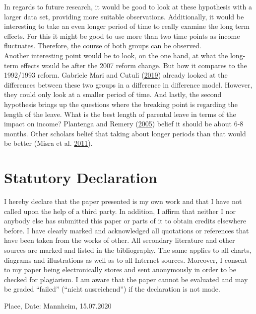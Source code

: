 \documentclass[
  12pt,
]{article}
\begin{document}
In regards to future research, it would be good to look at these hypothesis with a larger data set, providing more suitable observations. Additionally, it would be interesting to take an even longer period of time to really examine the long term effects. For this it might be good to use more than two time points as income fluctuates. Therefore, the course of both groups can be observed.\\
Another interesting point would be to look, on the one hand, at what the long-term effects would be after the 2007 reform change. But how it compares to the 1992/1993 reform.
Gabriele Mari and Cutuli (\protect\hyperlink{ref-gabriele_mari_parental_2019}{2019}) already looked at the differences between these two groups in a difference in difference model. However, they could only look at a smaller period of time.
And lastly, the second hypothesis brings up the questions where the breaking point is regarding the length of the leave. What is the best length of parental leave in terms of the impact on income? Plantenga and Remery (\protect\hyperlink{ref-plantenga_reconciliation_2005}{2005}) belief it should be about 6-8 months. Other scholars belief that taking about longer periods than that would be better (Misra et al. \protect\hyperlink{ref-misra_work-family_2011}{2011}).

\newpage

\hypertarget{statutory-declaration}{%
\section*{Statutory Declaration}\label{statutory-declaration}}

I hereby declare that the paper presented is my own work and that I have not called upon the help of a third party. In addition, I affirm that neither I nor anybody else has submitted this paper or parts of it to obtain credits elsewhere before. I have clearly marked and acknowledged all quotations or references that have been taken from the works of other. All secondary literature and other sources are marked and listed in the bibliography. The same applies to all charts, diagrams and illustrations as well as to all Internet sources. Moreover, I consent to my paper being electronically stores and sent anonymously in order to be checked for plagiarism. I am aware that the paper cannot be evaluated and may be graded ``failed'' (``nicht ausreichend'') if the declaration is not made.

Place, Date: Mannheim, 15.07.2020
\end{document}
